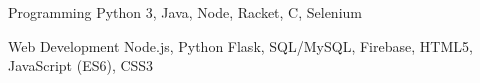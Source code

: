

\begin{cvskills}

  \cvskill
  {Programming} %
  {Python 3, Java, Node, Racket, C, Selenium} %

  \cvskill
  {Web Development} %
  {Node.js, Python Flask, SQL/MySQL, Firebase, HTML5, JavaScript (ES6), CSS3} %

\end{cvskills}
